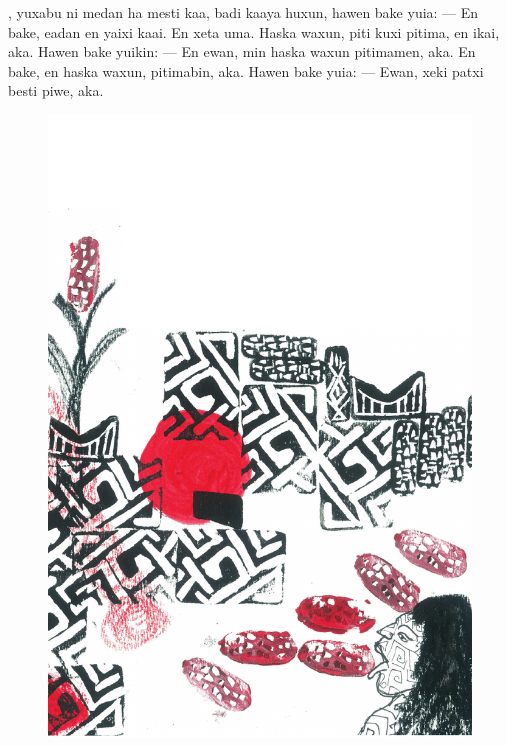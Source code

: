 , yuxabu ni medan
ha mesti kaa, badi kaaya
huxun, hawen bake yuia:\break
--- En bake, eadan en yaixi kaai. En
xeta uma. Haska waxun,
piti kuxi pitima, en ikai, aka.
Hawen bake yuikin:\break
--- En ewan, min haska waxun
pitimamen, aka. En bake, en haska
waxun, pitimabin, aka.
Hawen bake yuia:\break
--- Ewan, xeki patxi
besti piwe, aka.

\vspace*{\fill}

\pagebreak
\thispagestyle{empty}
\begin{figure}
\vspace*{-.5cm}
\hspace*{-2.2cm}\includegraphics[width=138mm]{./imgs/img4.pdf}
\end{figure}

\chapter*{}

